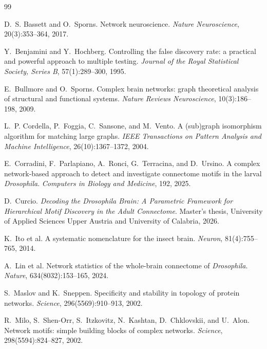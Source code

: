 \documentclass[12pt,a4paper,oneside]{article}
\theoremstyle{definition}
\theoremstyle{plain}
\begin{document}
\begin{thebibliography}{99}

D.~S. Bassett and O.~Sporns.
\newblock Network neuroscience.
\newblock \emph{Nature Neuroscience}, 20(3):353--364, 2017.

Y.~Benjamini and Y.~Hochberg.
\newblock Controlling the false discovery rate: a practical and powerful
  approach to multiple testing.
\newblock \emph{Journal of the Royal Statistical Society, Series B},
  57(1):289--300, 1995.

E.~Bullmore and O.~Sporns.
\newblock Complex brain networks: graph theoretical analysis of structural and
  functional systems.
\newblock \emph{Nature Reviews Neuroscience}, 10(3):186--198, 2009.

L.~P. Cordella, P.~Foggia, C.~Sansone, and M.~Vento.
\newblock A (sub)graph isomorphism algorithm for matching large graphs.
\newblock \emph{IEEE Transactions on Pattern Analysis and Machine
  Intelligence}, 26(10):1367--1372, 2004.

E.~Corradini, F.~Parlapiano, A.~Ronci, G.~Terracina, and D.~Ursino.
\newblock A complex network-based approach to detect and investigate
  connectome motifs in the larval \emph{Drosophila}.
\newblock \emph{Computers in Biology and Medicine}, 192, 2025.

D.~Curcio.
\newblock \emph{Decoding the Drosophila Brain: A Parametric Framework for
  Hierarchical Motif Discovery in the Adult Connectome}.
\newblock Master's thesis, University of Applied Sciences Upper Austria and
  University of Calabria, 2026.

K.~Ito et al.
\newblock A systematic nomenclature for the insect brain.
\newblock \emph{Neuron}, 81(4):755--765, 2014.

A.~Lin et al.
\newblock Network statistics of the whole-brain connectome of
  \emph{Drosophila}.
\newblock \emph{Nature}, 634(8032):153--165, 2024.

S.~Maslov and K.~Sneppen.
\newblock Specificity and stability in topology of protein networks.
\newblock \emph{Science}, 296(5569):910--913, 2002.

R.~Milo, S.~Shen-Orr, S.~Itzkovitz, N.~Kashtan, D.~Chklovskii, and U.~Alon.
\newblock Network motifs: simple building blocks of complex networks.
\newblock \emph{Science}, 298(5594):824--827, 2002.


\end{thebibliography}
\end{document}
